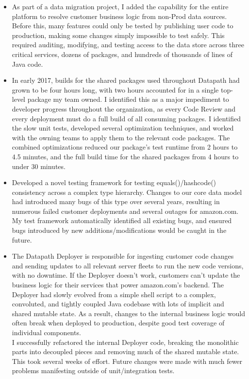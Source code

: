 \documentclass{res}
\begin{document}
\begin{resume}
\begin{itemize}
   \item As part of a data migration project, I added the capability for the entire platform to resolve customer business logic from non-Prod data sources.  Before this, many features could only be tested by publishing user code to production, making some changes simply impossible to test safely.  This required auditing, modifying, and testing access to the data store across three critical services, dozens of packages, and hundreds of thousands of lines of Java code.
   \item In early 2017, builds for the shared packages used throughout Datapath had grown to be four hours long, with two hours accounted for in a single top-level package my team owned.  I identified this as a major impediment to developer progress throughout the organization, as every Code Review and every deployment must do a full build of all consuming packages.  I identified the slow unit tests, developed several optimization techniques, and worked with the owning teams to apply them to the relevant code packages.  The combined optimizations reduced our package's test runtime from 2 hours to 4.5 minutes, and the full build time for the shared packages from 4 hours to under 30 minutes.
   \item Developed a novel testing framework for testing equals()/hashcode() consistency across a complex type hierarchy.  Changes to our core data model had introduced many bugs of this type over several years, resulting in numerous failed customer deployments and several outages for amazon.com.  My test framework automatically identified all existing bugs, and ensured bugs introduced by new additions/modifications would be caught in the future.
   \item The Datapath Deployer is responsible for ingesting customer code changes and sending updates to all relevant server fleets to run the new code versions, with no downtime.  If the Deployer doesn't work, customers can't update the business logic for their services that power amazon.com's backend.  The Deployer had slowly evolved from a simple shell script to a complex, convoluted, and tightly coupled Java codebase with lots of implicit and shared mutable state.  As a result, changes to the internal business logic would often break when deployed to production, despite good test coverage of individual components.\\
   I successfully refactored the internal Deployer code, breaking the monolithic parts into decoupled pieces and removing much of the shared mutable state.  This took several weeks of effort.  Future changes were made with much fewer problems manifesting outside of unit/integration tests.

\end{itemize}
\end{resume}
\end{document}
